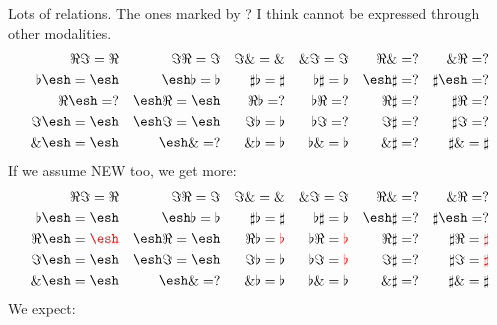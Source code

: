 \documentclass[a4paper,12pt]{article}
\newcommand{\Red}{\Re}
\newcommand{\Cored}{\Im}
\newcommand{\Wat}{\&}
\newcommand{\shape}{\ensuremath{\mathord{\raisebox{0.5pt}{\text{\rm\esh}}}}}
\begin{document}
Lots of relations. The ones marked by ? I think cannot be expressed through other modalities.
\begin{align*}
    \Red \Cored = \Red && \Cored \Red = \Cored && \Cored \Wat = \Wat && \Wat \Cored = \Cored && \Red \Wat = ? && \Wat \Red = ? \\
    \flat \shape = \shape && \shape \flat = \flat && \sharp \flat = \sharp && \flat \sharp = \flat && \shape \sharp = ? && \sharp \shape = ? \\
    \Red \shape = ? && \shape \Red = \shape && \Red \flat = ? && \flat \Red = ? && \Red \sharp = ? && \sharp \Red = ? \\
    \Cored \shape = \shape && \shape \Cored = \shape && \Cored \flat = \flat && \flat \Cored = ? && \Cored \sharp = ? && \sharp \Cored = ? \\
    \Wat \shape = \shape && \shape \Wat = ? && \Wat \flat = \flat && \flat \Wat = \flat && \Wat \sharp = ? && \sharp \Wat = \sharp
\end{align*}
If we assume NEW too, we get more:
\begin{align*}
    \Red \Cored = \Red && \Cored \Red = \Cored && \Cored \Wat = \Wat && \Wat \Cored = \Cored && \Red \Wat = ? && \Wat \Red = ? \\
    \flat \shape = \shape && \shape \flat = \flat && \sharp \flat = \sharp && \flat \sharp = \flat && \shape \sharp = ? && \sharp \shape = ? \\
    \Red \shape = \color{red}{\shape} && \shape \Red = \shape && \Red \flat = \color{red}{\flat} && \flat \Red = \color{red}{\flat} && \Red \sharp = ? && \sharp \Red = \color{red}{\sharp} \\
    \Cored \shape = \shape && \shape \Cored = \shape && \Cored \flat = \flat && \flat \Cored = \color{red}{\flat} && \Cored \sharp = ? && \sharp \Cored = \color{red}{\sharp} \\
    \Wat \shape = \shape && \shape \Wat = ? && \Wat \flat = \flat && \flat \Wat = \flat && \Wat \sharp = ? && \sharp \Wat = \sharp
\end{align*}
We expect:
\end{document}
